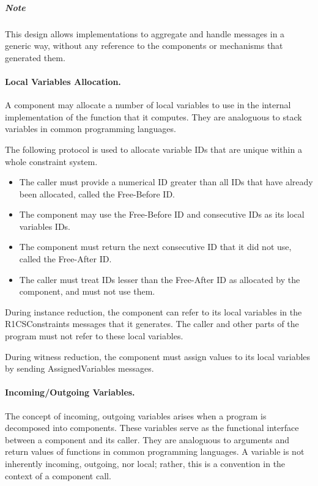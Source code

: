 	\subparagraph{Note}
	This design allows implementations to aggregate and handle messages in a generic way,
	without any	reference to the components or mechanisms that generated them.


\paragraph{Local Variables Allocation.}

	A component may allocate a number of local variables to use
	in the internal implementation of the function that it computes.
	They are analoguous to stack variables in common programming languages.

	The following protocol is used to allocate variable IDs that are
	unique within a whole constraint system.
	\begin{itemize}
		\item The caller must provide a numerical ID greater than all IDs that have already been allocated, called the Free-Before ID.
		\item The component may use the Free-Before ID and consecutive IDs as its local variables IDs.
		\item The component must return the next consecutive ID that it did not use, called the Free-After ID.
		\item The caller must treat IDs lesser than the Free-After ID as allocated by the component,
			and must not use them.
	\end{itemize}

	During instance reduction, the component can refer to
	its local variables in the R1CSConstraints messages that it generates.
	The caller and other parts of the program must not refer to these local variables.

	During witness reduction, the component must assign values to its local variables
	by sending AssignedVariables messages.

\paragraph{Incoming/Outgoing Variables.}

	The concept of incoming, outgoing variables arises when a program is decomposed into components.
	These variables serve as the functional interface between a component and its caller.
	They are analoguous to arguments and return values of functions in common programming languages.
	A variable is not inherently incoming, outgoing, nor local;
	rather, this is a convention in the context of a component call.

